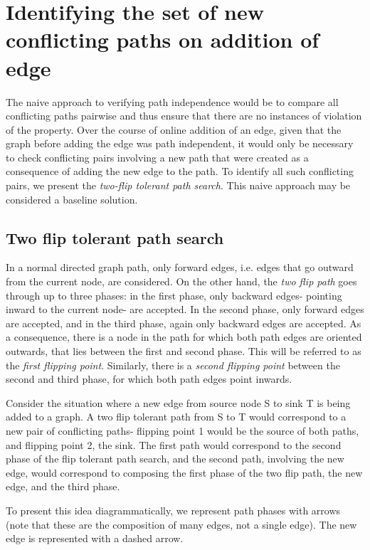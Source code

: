 \documentclass{article}
\begin{document}
\section{Identifying the set of new conflicting paths on addition of edge}

The naive approach to verifying path independence would be to compare all conflicting paths pairwise and thus ensure that there are no instances of violation of the property. Over the course of online addition of an edge, given that the graph before adding the edge was path independent, it would only be necessary to check conflicting pairs involving a new path that were created as a consequence of adding the new edge to the path.
To identify all such conflicting pairs, we present the \textit{two-flip tolerant path search}. This naive approach may be considered a baseline solution.

\subsection{Two flip tolerant path search}
In a normal directed graph path, only forward edges, i.e. edges that go outward from the current node, are considered. 
On the other hand, the \textit{two flip path} goes through up to three phases: in the first phase, only backward edges- pointing inward to the current node- are accepted. In the second phase, only forward edges are accepted, and in the third phase, again only backward edges are accepted. As a consequence, there is a node in the path for which both path edges are oriented outwards, that lies between the first and second phase. This will be referred to as the \textit{first flipping point}. Similarly, there is a \textit{second flipping point} between the second and third phase, for which both path edges point inwards.

Consider the situation where a new edge from source node S to sink T is being added to a graph.
A two flip tolerant path from S to T would correspond to a new pair of conflicting paths- flipping point 1 would be the source of both paths, and flipping point 2, the sink. The first path would correspond to the second phase of the flip tolerant path search, and the second path, involving the new edge, would correspond to composing the first phase of the two flip path, the new edge, and the third phase.

To present this idea diagrammatically, we represent path phases with arrows (note that these are the composition of many edges, not a single edge). The new edge is represented with a dashed arrow.
\end{document}
